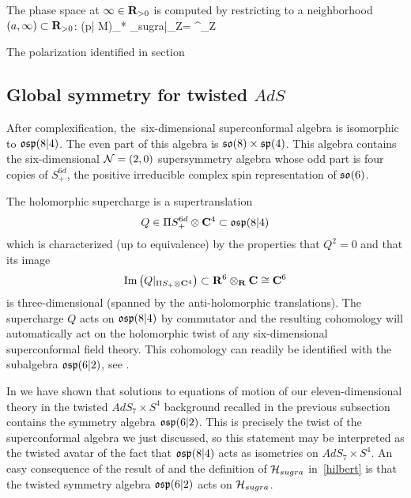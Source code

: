 The phase space at $\infty\in \mathbf{R}_{>0}$ is computed by restricting to a neighborhood $(a, \infty)\subset \mathbf{R}_{>0}$:
\beqn
(p| \mathring M)_* \cL_{sugra}|_{\infty \times Z}= \cA^\bullet_Z \otimes
\eeqn

The polarization identified in section



\subsection{Global symmetry for twisted $AdS$}
\label{s:global1}

After complexification, the~six-dimensional superconformal algebra is isomorphic to $\mathfrak{osp}(8|4)$.
The even part of this algebra is $\mathfrak{so}(8) \times \mathfrak{sp}(4)$.
This algebra contains the six-dimensional $\mathcal N=(2,0)$ supersymmetry algebra whose odd part is four copies of $S^{6d}_+$, the positive irreducible complex spin representation of $\mathfrak{so}(6)$.

The holomorphic supercharge is a supertranslation
\[
Q \in \Pi S^{6d}_+ \otimes \mathbf{C}^4 \subset \mathfrak{osp}(8|4)
\]
which is characterized (up to equivalence) by the properties that $Q^2 = 0$ and that its image
\[
{\rm Im}\left(Q|_{\Pi S_+ \otimes \mathbf{C}^4} \right) \subset \mathbf{R}^6 \otimes_{\mathbf{R}} \mathbf{C} \cong \mathbf{C}^6
\]
is three-dimensional (spanned by the anti-holomorphic translations). 
The supercharge $Q$ acts on $\mathfrak{osp}(8|4)$ by commutator and the resulting cohomology will automatically act on the holomorphic twist of any six-dimensional superconformal field theory. 
This cohomology can readily be identified with the subalgebra $\mathfrak{osp}(6|2)$, see \cite{SWsuco2}. 


In \cite{RSW} we have shown that solutions to equations of motion of our eleven-dimensional theory in the twisted $AdS_{7}\times S^{4}$ background recalled in the previous subsection contains the symmetry algebra $\mathfrak{osp}(6|2)$. This is precisely the twist of the superconformal algebra we just discussed, so this statement may be interpreted as the twisted avatar of the fact that $\mathfrak{osp}(8|4)$ acts as isometries on $AdS_{7}\times S^{4}.$ An easy consequence of the result of \cite{RSW} and the definition of $\mathcal H_{sugra}$ in~\ref{hilbert} is that the twisted symmetry algebra $\mathfrak{osp}(6|2)$ acts on $\mathcal H_{sugra}$.

